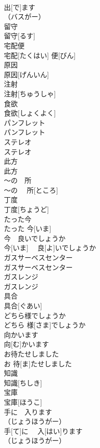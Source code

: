 \documentclass[8pt]{extreport}
\begin{document}
\begin{CJK}{UTF8}{min}
\\	出[で]ます
\\	（バスがー）
\\	留守	
\\	留守[るす]	
\\	宅配便	
\\	宅配[たくはい] 便[びん]	
\\	原因	
\\	原因[げんいん]	
\\	注射	
\\	注射[ちゅうしゃ]	
\\	食欲	
\\	食欲[しょくよく]	
\\	パンフレット	
\\	パンフレット	
\\	ステレオ	
\\	ステレオ	
\\	此方	
\\	此方	
\\	〜の　所	
\\	〜の　 所[ところ]	
\\	丁度	
\\	丁度[ちょうど]	
\\	たった今	
\\	たった 今[いま]	
\\	今　良いでしょうか	
\\	今[いま]　 良[よ]いでしょうか	
\\	ガスサーベスセンター	
\\	ガスサーベスセンター	
\\	ガスレンジ	
\\	ガスレンジ	
\\	具合	
\\	具合[ぐあい]	
\\	どちら様でしょうか	
\\	どちら 様[さま]でしょうか	
\\	向かいます	
\\	向[む]かいます	
\\	お待たせしました	
\\	お 待[ま]たせしました	
\\	知識	
\\	知識[ちしき]	
\\	宝庫	
\\	宝庫[ほうこ]	
\\	手に　入ります
\\	（じょうほうがー）
\\	手[て]に　 入[はい]ります
\\	（じょうほうがー）

\end{CJK}
\end{document}
